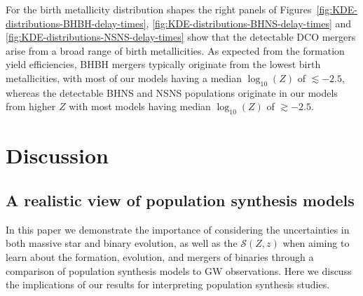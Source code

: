 \documentclass[fleqn,usenatbib]{mnras}
\newcommand{\Zi}{\ensuremath{Z}\xspace}
\newcommand{\SFRD}{\ensuremath{\mathcal{S}(Z,z)}\xspace}
\begin{document}
For the birth metallicity distribution shapes the right panels of Figures~\ref{fig:KDE-distributions-BHBH-delay-times}, \ref{fig:KDE-distributions-BHNS-delay-times} and \ref{fig:KDE-distributions-NSNS-delay-times} show that the detectable \ac{DCO} mergers arise from a broad range of birth metallicities. As expected from the formation yield efficiencies, BHBH mergers typically originate from the lowest birth metallicities, with most of our models having a median $\log_{10}(\Zi)$ of $\lesssim -2.5$, whereas the detectable \ac{BHNS} and \ac{NSNS} populations originate in our models from higher \Zi with  most models having median $\log_{10}(\Zi)$ of $\gtrsim -2.5$. 





%










\section{Discussion}
\label{sec:discussion}

\subsection{A realistic view of population synthesis models}
\label{sec:discussion-pop-synth-is-uncertain}

In this paper we demonstrate the importance of considering the uncertainties in both massive star and binary evolution, as well as the \SFRD when aiming to learn about the formation, evolution, and mergers of binaries through a comparison of population synthesis models to GW observations. Here we discuss the implications of our results for interpreting population synthesis studies. 
\end{document}
